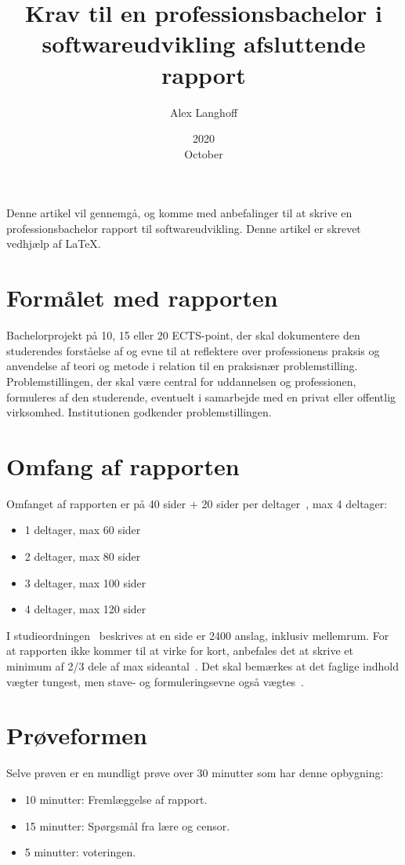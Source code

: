 \documentclass{article}
\title{Krav til en professionsbachelor i softwareudvikling afsluttende rapport}
\date{2020\\ October}
\author{Alex Langhoff}
\begin{document}
\maketitle

Denne artikel vil gennemgå, og komme med anbefalinger til at skrive en professionsbachelor rapport til softwareudvikling.
Denne artikel er skrevet vedhjælp af \LaTeX.


\section{Formålet med rapporten}
Bachelorprojekt på 10, 15 eller 20 ECTS-point, der skal dokumentere den studerendes forståelse af og evne til at reflektere over professionens praksis og anvendelse af teori og metode i relation til en praksisnær problemstilling. Problemstillingen, der skal være central for uddannelsen og professionen, formuleres af den studerende, eventuelt i samarbejde med en privat eller offentlig virksomhed. Institutionen godkender problemstillingen.~\cite{bekendt}


\section{Omfang af rapporten}
Omfanget af rapporten er på 40 sider + 20 sider per deltager~\cite{kickoff}, max 4 deltager:

\begin{itemize}
\item 1 deltager, max 60 sider
\item 2 deltager, max 80 sider
\item 3 deltager, max 100 sider
\item 4 deltager, max 120 sider
\end{itemize}

I studieordningen~\cite{studie} beskrives at en side er 2400 anslag, inklusiv mellemrum.
For at rapporten ikke kommer til at virke for kort, anbefales det at skrive et minimum af 2/3 dele af max sideantal~\cite{kickoff}.
Det skal bemærkes at det faglige indhold vægter tungest, men stave- og formuleringsevne også vægtes~\cite{studie}.



\section{Prøveformen}
Selve prøven er en mundligt prøve over 30 minutter som har denne opbygning:
\begin{itemize}
\item 10 minutter: Fremlæggelse af rapport.
\item 15 minutter: Spørgsmål fra lære og censor.
\item 5 minutter: voteringen.
\end{itemize}
\end{document}
